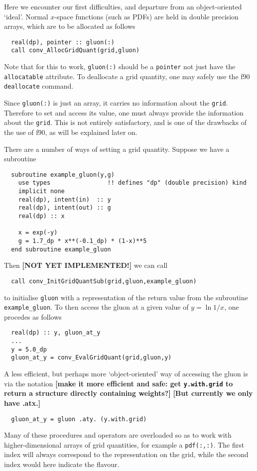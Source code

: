 \documentclass[12pt]{article}
\newcommand{\comment}[1]{\textbf{[#1]}}
\begin{document}
Here we encounter our first difficulties, and departure from an
object-oriented `ideal'. Normal $x$-space functions (such as PDFs) are
held in double precision arrays, which are to be allocated as follows
\begin{verbatim}
  real(dp), pointer :: gluon(:)
  call conv_AllocGridQuant(grid,gluon)
\end{verbatim}
Note that for this to work, \texttt{gluon(:)} should be a
\texttt{pointer} not just have the \texttt{allocatable} attribute. To
deallocate a grid quantity, one may safely use the f90
\texttt{deallocate} command.

Since \texttt{gluon(:)} is just an array, it carries no information
about the \texttt{grid}. Therefore to set and access its value, one
must always provide the information about the \texttt{grid}. This is
not entirely satisfactory, and is one of the drawbacks of the use of
f90, as will be explained later on.

There are a number of ways of setting a grid quantity. Suppose we have
a subroutine
\begin{verbatim}
  subroutine example_gluon(y,g)
    use types                !! defines "dp" (double precision) kind
    implicit none
    real(dp), intent(in)  :: y
    real(dp), intent(out) :: g
    real(dp) :: x
    
    x = exp(-y)
    g = 1.7_dp * x**(-0.1_dp) * (1-x)**5 
  end subroutine example_gluon
\end{verbatim}
Then \comment{NOT YET IMPLEMENTED!} we can call
\begin{verbatim}
  call conv_InitGridQuantSub(grid,gluon,example_gluon)
\end{verbatim}
to initialise \texttt{gluon} with a representation of the return value
from the subroutine \texttt{example\_gluon}. To then access the gluon
at a given value of $y = \ln 1/x$, one procedes as follows
\begin{verbatim}
  real(dp) :: y, gluon_at_y
  ...
  y = 5.0_dp
  gluon_at_y = conv_EvalGridQuant(grid,gluon,y)
\end{verbatim}
A less efficient, but perhaps more `object-oriented' way of accessing
the gluon is via the notation \comment{make it more efficient and
  safe: get \texttt{y.with.grid} to return a structure directly
  containing weights?} \comment{But currently we only have .atx.}
\begin{verbatim}
  gluon_at_y = gluon .aty. (y.with.grid)
\end{verbatim}
Many of these procedures and operators are overloaded so as to work
with higher-dimensional arrays of grid quantities, for example a
\texttt{pdf(:,:)}. The first index will always correspond to the
representation on the grid, while the second index would here indicate
the flavour.
\end{document}
